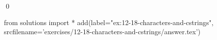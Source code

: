 
\begin{ex}
  \label{ex:12-18-characters-and-cstrings}
  
  \qed
\end{ex}
\begin{python0}
from solutions import *
add(label="ex:12-18-characters-and-cstrings",
    srcfilename='exercises/12-18-characters-and-cstrings/answer.tex')
\end{python0}
